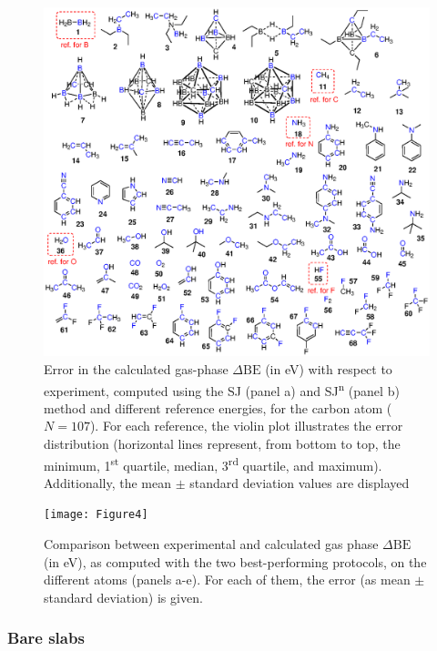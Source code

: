 \documentclass[%
aip,
amsmath,amssymb,
preprint,%
jcp,
showkeys,
]{revtex4-2}
\def\dbe{\ensuremath{\Delta\text{BE}}}
\begin{document}
\begin{figure}
	\centering
	\includegraphics[width=\linewidth]{Figure3}
	\caption{Error in the calculated gas-phase \dbe{}  (in \si{\electronvolt}) with respect to experiment, computed using the SJ (panel a) and SJ\textsuperscript{n} (panel b) method and different reference energies, for the carbon atom ($N=107$). For each reference, the violin plot illustrates the error distribution (horizontal lines represent, from bottom to top, the minimum, 1\textsuperscript{st} quartile, median, 3\textsuperscript{rd} quartile, and maximum). Additionally, the mean $\pm$ standard deviation values are displayed}
	\label{fig:xps_C185_C}
\end{figure}


\begin{figure}[p]
	\centering
	\texttt{[image: Figure4]}
	\caption{Comparison between experimental and calculated gas phase \dbe{} (in \si{\electronvolt}), as computed with the two best-performing protocols, on the different atoms (panels a-e). For each of them, the error (as mean $\pm$ standard deviation) is given.}
	\label{fig:xps_C185}
\end{figure}

\clearpage

\subsubsection{Bare slabs}
\end{document}
